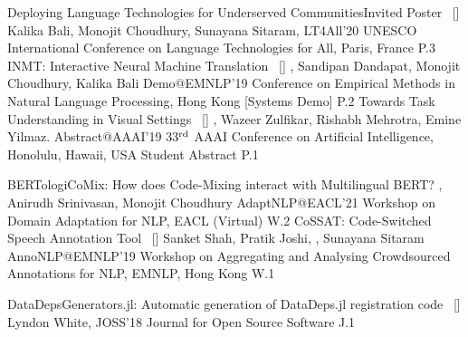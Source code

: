 \begin{publications}	
	
\publication
    {Deploying Language Technologies for Underserved Communities}{\lbrack Invited Poster\rbrack ~ [\href{https://lt4all.elra.info/media/papers/P5/65.html}{\small{\linkSymbol}}]}
    {Kalika Bali, Monojit Choudhury, Sunayana Sitaram, \underline{}}
	{LT4All'20} {UNESCO International Conference on Language Technologies for All, Paris, France} {P.3}
\publication
    {INMT: Interactive Neural Machine Translation}{~ [\href{https://www.aclweb.org/anthology/D19-3018/}{\small{\linkSymbol}}]}
	{\underline{}, Sandipan Dandapat, Monojit Choudhury, Kalika Bali}
	{Demo@EMNLP'19} {Conference on Empirical Methods in Natural Language Processing, Hong Kong [Systems Demo]} {P.2}
\publication
	{Towards Task Understanding in Visual Settings}{~ [\href{https://arxiv.org/abs/1811.11833}{\small{\linkSymbol}}]}
	{\underline{}, Wazeer Zulfikar, Rishabh Mehrotra, Emine Yilmaz.}
	{Abstract@AAAI'19} {33$^{\textrm{\scriptsize rd}}$ AAAI Conference on Artificial Intelligence, Honolulu, Hawaii, USA \lbrack Student Abstract\rbrack} {P.1}
	
	
\publication
    {BERTologiCoMix: How does Code-Mixing interact with Multilingual BERT?}{}
    {\underline{}, Anirudh Srinivasan, Monojit Choudhury}
	{AdaptNLP@EACL'21} {Workshop on Domain Adaptation for NLP, EACL (Virtual)} {W.2}
\publication
	{CoSSAT: Code-Switched Speech Annotation Tool}{~ [\href{https://www.aclweb.org/anthology/D19-5907/}{\small{\linkSymbol}}]}
	{Sanket Shah, Pratik Joshi, \underline{}, Sunayana Sitaram}
	{AnnoNLP@EMNLP'19} {Workshop on Aggregating and Analysing Crowdsourced Annotations for NLP, EMNLP, Hong Kong} {W.1}


\publication
	{DataDepsGenerators.jl: Automatic generation of DataDeps.jl registration code}{~ [\href{https://joss.theoj.org/papers/10.21105/joss.00921}{\small{\linkSymbol}}]}
	{Lyndon White, \underline{}}
	{JOSS'18} {Journal for Open Source Software} {J.1}
	
\end{publications}

\vspace{-3mm}
